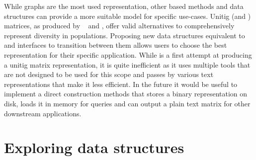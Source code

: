 While graphs are the most used representation, other \kmer based methods and data structures can provide a more suitable model for specific use-cases. Unitig (and \kmer) matrices, as produced by  \kmt~\cite{kmtricks} and \muset, offer valid alternatives to comprehensively represent diversity in populations. Proposing new data structures equivalent to \ccdbgs and interfaces to transition between them allows users to choose the best representation for their specific application. While \muset is a first attempt at producing a unitig matrix representation, it is quite inefficient as it uses multiple tools that are not designed to be used for this scope and passes by various text representations that make it less efficient. In the future it would be useful to implement a direct construction methods that stores a binary representation on disk, loads it in memory for queries and can output a plain text matrix for other downstream applications. 


\section{Exploring \kmer data structures}


